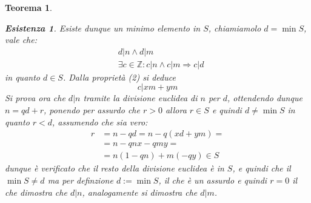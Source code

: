 \documentclass{article}
\makeatletter
\renewenvironment{proof}[1][\proofname]{\par
    \pushQED{\qed}%
    \normalfont \topsep6\p@\@plus6\p@\relax
    \trivlist
    \item\relax
    {\itshape
    #1\@addpunct{.}}\hspace\labelsep\ignorespaces
    }{%
    \popQED\endtrivlist\@endpefalse
}
\newtheorem{theorem}{Teorema}[part]
\newtheorem*{existence}{Esistenza}
\makeatother
\begin{document}
\begin{theorem}
\begin{proof}
\begin{existence}
            Esiste dunque un minimo elemento in \(S\), chiamiamolo \(d=\min S\), vale che: 
            \[
                \begin{aligned}
                    &d|n \wedge d|m\\
                    &\exists c\in\mathbb{Z}: c|n \wedge c|m \Rightarrow c|d
                \end{aligned}
            \]
            in quanto \(d\in S\).
            Dalla proprietà (2) si deduce \[c|xm+ym\]
            Si prova ora che \(d|n\) tramite la divisione euclidea di \(n\) per \(d\), ottendendo dunque \(n=qd+r\), ponendo per assurdo che \(r>0\) allora \(r\in S\) e quindi \(d\neq \min S\) in quanto \(r<d\), assumendo che sia vero:
            \[
                \begin{aligned}
                    r&=n-qd=n-q(xd+ym)=\\
                    &=n-qnx-qmy=\\
                    &=n(1-qn)+m(-qy)\in S
                \end{aligned}
            \]
            dunque è verificato che il resto della divisione euclidea è in \(S\), e quindi che il \(\min S\neq d\) ma per definzione \(d:=\min S\), il che è un assurdo e quindi \(r=0\) il che dimostra che \(d|n\), analogamente si dimostra che \(d|m\).
        \end{existence}
        \raggedleft{\pushQED{\ensuremath{\blacksquare}}}
    \end{proof}
\end{theorem}
\end{document}
